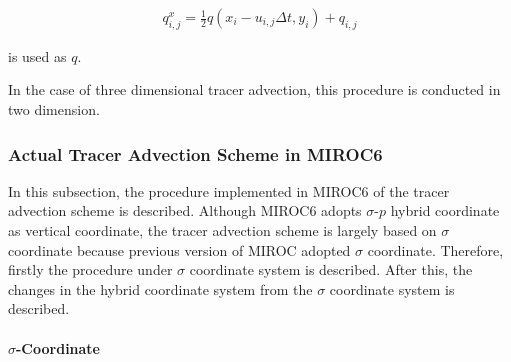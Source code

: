 \begin{eqnarray}
q^{x}_{i,j}=\frac{1}{2} {q(x_{i}-u_{i,j}\Delta t,y_{i})+q_{i,j}}
\end{eqnarray}

is used as \(q\).

In the case of three dimensional tracer advection, this procedure is conducted in two dimension.

\hypertarget{actual-tracer-advection-scheme-in-miroc6}{%
\subsubsection{Actual Tracer Advection Scheme in MIROC6}\label{actual-tracer-advection-scheme-in-miroc6}}

In this subsection, the procedure implemented in MIROC6 of the tracer advection scheme is described. Although MIROC6 adopts \(\sigma\)-\(p\) hybrid coordinate as vertical coordinate, the tracer
advection scheme is largely based on \(\sigma\) coordinate because previous version of MIROC adopted \(\sigma\) coordinate. Therefore, firstly the procedure under \(\sigma\) coordinate system is
described. After this, the changes in the hybrid coordinate system from the \(\sigma\) coordinate system is described.

\hypertarget{sigma-coordinate}{%
\paragraph{\texorpdfstring{\(\sigma\)-Coordinate}{\textbackslash sigma-Coordinate}}\label{sigma-coordinate}}

